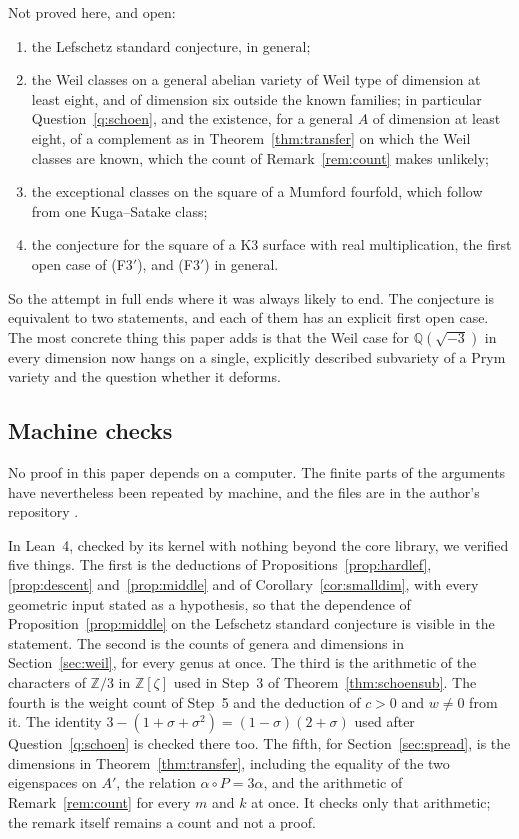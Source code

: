 \documentclass[11pt]{amsart}
\theoremstyle{definition}
\theoremstyle{remark}
\newcommand{\QQ}{\mathbb{Q}}
\newcommand{\ZZ}{\mathbb{Z}}
\begin{document}
Not proved here, and open:
\begin{enumerate}[label=(\roman*)]
\item the Lefschetz standard conjecture, in general;
\item the Weil classes on a general abelian variety of Weil type of
dimension at least eight, and of dimension six outside the known families;
in particular Question~\ref{q:schoen}, and the existence, for a general $A$
of dimension at least eight, of a complement as in
Theorem~\ref{thm:transfer} on which the Weil classes are known, which the
count of Remark~\ref{rem:count} makes unlikely;
\item the exceptional classes on the square of a Mumford fourfold, which
follow from one Kuga--Satake class;
\item the conjecture for the square of a K3 surface with real
multiplication, the first open case of (F3$'$), and (F3$'$) in general.
\end{enumerate}

So the attempt in full ends where it was always likely to end. The
conjecture is equivalent to two statements, and each of them has an explicit
first open case. The most concrete thing this paper adds is that the Weil
case for $\QQ(\sqrt{-3})$ in every dimension now hangs on a single, explicitly
described subvariety of a Prym variety and the question whether it deforms.

\subsection*{Machine checks}
No proof in this paper depends on a computer. The finite parts of the
arguments have nevertheless been repeated by machine, and the files are in
the author's repository \cite{BhHC}.

In Lean~4, checked by its kernel with nothing beyond the core library, we
verified five things. The first is the deductions of
Propositions~\ref{prop:hardlef}, \ref{prop:descent} and~\ref{prop:middle} and
of Corollary~\ref{cor:smalldim}, with every geometric input stated as a
hypothesis, so that the dependence of Proposition~\ref{prop:middle} on the
Lefschetz standard conjecture is visible in the statement. The second is the
counts of genera and dimensions in Section~\ref{sec:weil}, for every genus at
once. The third is the arithmetic of the characters of $\ZZ/3$ in $\ZZ[\zeta]$
used in Step~3 of Theorem~\ref{thm:schoensub}. The fourth is the weight count
of Step~5 and the deduction of $c>0$ and $w\ne0$ from it. The identity
$3-(1+\sigma+\sigma^{2})=(1-\sigma)(2+\sigma)$ used after
Question~\ref{q:schoen} is checked there too. The fifth, for
Section~\ref{sec:spread}, is the dimensions in Theorem~\ref{thm:transfer}, including the
equality of the two eigenspaces on $A'$, the relation $\alpha\circ P=3\alpha$,
and the arithmetic of Remark~\ref{rem:count} for every $m$ and $k$ at once.
It checks only that arithmetic; the remark itself remains a count and not a
proof.
\end{document}
